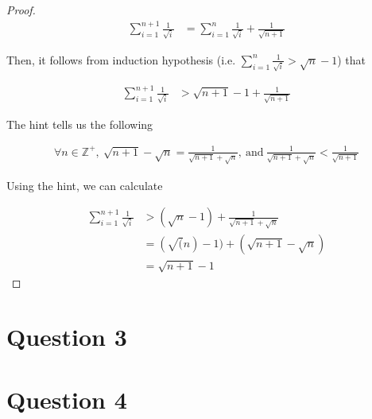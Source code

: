 \documentclass[12pt]{article}
\begin{document}
\begin{itemize}
\begin{proof}
        \begin{align}
            \sum\limits_{i=1}^{n+1} \frac{1}{\sqrt{i}} &= \sum\limits_{i=1}^n \frac{1}{\sqrt{i}} + \frac{1}{\sqrt{n+1}}
        \end{align}

        \bigskip

        Then, it follows from induction hypothesis (i.e. $\sum\limits_{i=1}^{n} \frac{1}{\sqrt{i}} > \sqrt{n} - 1$) that

        \begin{align}
            \sum\limits_{i=1}^{n+1} \frac{1}{\sqrt{i}} &>  \sqrt{n+1} - 1 + \frac{1}{\sqrt{n+1}}
        \end{align}

        \bigskip

        The hint tells us the following

        \begin{align}
            \forall n \in \mathbb{Z}^{+},\:\sqrt{n+1} - \sqrt{n} = \frac{1}{\sqrt{n+1} + \sqrt{n}},\:\text{and}\:\frac{1}{\sqrt{n+1} + \sqrt{n}} < \frac{1}{\sqrt{n+1}}
        \end{align}

        \bigskip

        Using the hint, we can calculate

        \begin{align}
            \sum\limits_{i=1}^{n+1} \frac{1}{\sqrt{i}} &> (\sqrt{n}-1) + \frac{1}{\sqrt{n+1} + \sqrt{n}}\\
            &= (\sqrt(n) - 1) + (\sqrt{n+1} - \sqrt{n})\\
            &= \sqrt{n+1} - 1
        \end{align}
    \end{proof}

\end{itemize}

\section*{Question 3}

\section*{Question 4}
\end{document}
